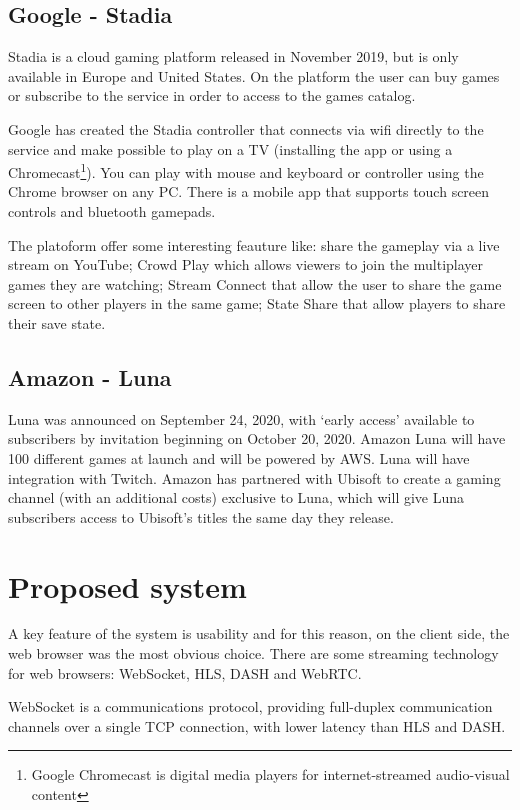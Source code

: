 \subsection{Google - Stadia}
Stadia is a cloud gaming platform released in November 2019, but is only available in Europe and United States. On the platform the user can buy games or subscribe to the service in order to access to the games catalog.

Google has created the Stadia controller that connects via wifi directly to the service and make possible to play on a TV (installing the app or using a Chromecast\footnote{Google Chromecast is digital media players for internet-streamed audio-visual content}). You can play with mouse and keyboard or controller using the Chrome browser on any PC. There is a mobile app that supports touch screen controls and bluetooth gamepads.

The platoform offer some interesting feauture like: share the gameplay via a live stream on YouTube; Crowd Play which allows viewers to join the multiplayer games they are watching; Stream Connect that allow the user to share the game screen to other players in the same game; State Share that allow players to share their save state\cite{Google_Stadia}.

\subsection{Amazon - Luna}
Luna was announced on September 24, 2020, with ‘early access’ available to subscribers by invitation beginning on October 20, 2020. Amazon Luna will have 100 different games at launch and will be powered by AWS. Luna will have integration with Twitch. Amazon has partnered with Ubisoft to create a gaming channel (with an additional costs) exclusive to Luna, which will give Luna subscribers access to Ubisoft's titles the same day they release\cite{Amazon_Luna}.


\section{Proposed system}
A key feature of the system is usability and for this reason, on the client side, the web browser was the most obvious choice.
There are some streaming technology for web browsers: WebSocket, HLS, DASH and WebRTC\cite{Audio_and_video_delivery}.

WebSocket is a communications protocol, providing full-duplex communication channels over a single TCP connection, with lower latency than HLS and DASH.

